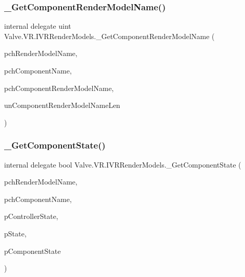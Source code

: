 \subsubsection{\texorpdfstring{\_GetComponentRenderModelName()}{\_GetComponentRenderModelName()}}
{\footnotesize\ttfamily internal delegate uint Valve.\+V\+R.\+I\+V\+R\+Render\+Models.\+\_\+\+Get\+Component\+Render\+Model\+Name (\begin{DoxyParamCaption}\item[{string}]{pch\+Render\+Model\+Name,  }\item[{string}]{pch\+Component\+Name,  }\item[{System.\+Text.\+String\+Builder}]{pch\+Component\+Render\+Model\+Name,  }\item[{uint}]{un\+Component\+Render\+Model\+Name\+Len }\end{DoxyParamCaption})}

\mbox{\label{struct_valve_1_1_v_r_1_1_i_v_r_render_models_af79285d56f002d4aee1bfc4ad0b1bb78}} 
\subsubsection{\texorpdfstring{\_GetComponentState()}{\_GetComponentState()}}
{\footnotesize\ttfamily internal delegate bool Valve.\+V\+R.\+I\+V\+R\+Render\+Models.\+\_\+\+Get\+Component\+State (\begin{DoxyParamCaption}\item[{string}]{pch\+Render\+Model\+Name,  }\item[{string}]{pch\+Component\+Name,  }\item[{ref \mbox{\hyperlink{struct_valve_1_1_v_r_1_1_v_r_controller_state__t}{V\+R\+Controller\+State\+\_\+t}}}]{p\+Controller\+State,  }\item[{ref \mbox{\hyperlink{struct_valve_1_1_v_r_1_1_render_model___controller_mode___state__t}{Render\+Model\+\_\+\+Controller\+Mode\+\_\+\+State\+\_\+t}}}]{p\+State,  }\item[{ref \mbox{\hyperlink{struct_valve_1_1_v_r_1_1_render_model___component_state__t}{Render\+Model\+\_\+\+Component\+State\+\_\+t}}}]{p\+Component\+State }\end{DoxyParamCaption})}

